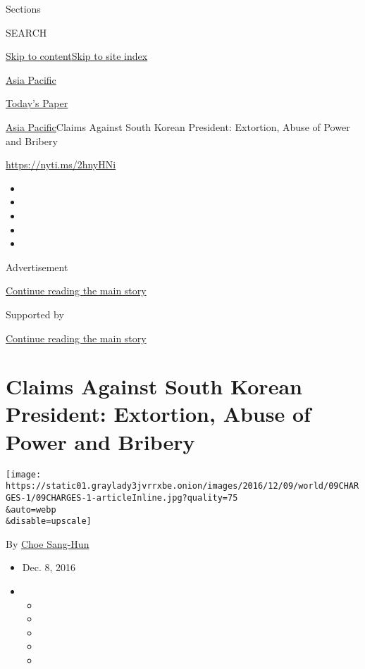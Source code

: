 Sections

SEARCH

\protect\hyperlink{site-content}{Skip to
content}\protect\hyperlink{site-index}{Skip to site index}

\href{https://www.nytimes3xbfgragh.onion/section/world/asia}{Asia
Pacific}

\href{https://myaccount.nytimes3xbfgragh.onion/auth/login?response_type=cookie\&client_id=vi}{}

\href{https://www.nytimes3xbfgragh.onion/section/todayspaper}{Today's
Paper}

\href{/section/world/asia}{Asia Pacific}\textbar{}Claims Against South
Korean President: Extortion, Abuse of Power and Bribery

\url{https://nyti.ms/2hnyHNi}

\begin{itemize}
\item
\item
\item
\item
\item
\end{itemize}

Advertisement

\protect\hyperlink{after-top}{Continue reading the main story}

Supported by

\protect\hyperlink{after-sponsor}{Continue reading the main story}

\hypertarget{claims-against-south-korean-president-extortion-abuse-of-power-and-bribery}{%
\section{Claims Against South Korean President: Extortion, Abuse of
Power and
Bribery}\label{claims-against-south-korean-president-extortion-abuse-of-power-and-bribery}}

\texttt{[image: https://static01.graylady3jvrrxbe.onion/images/2016/12/09/world/09CHARGES-1/09CHARGES-1-articleInline.jpg?quality=75\\\&auto=webp\\\&disable=upscale]}

By \href{http://www.nytimes3xbfgragh.onion/by/choe-sang-hun}{Choe
Sang-Hun}

\begin{itemize}
\item
  Dec. 8, 2016
\item
  \begin{itemize}
  \item
  \item
  \item
  \item
  \item
  \end{itemize}
\end{itemize}

